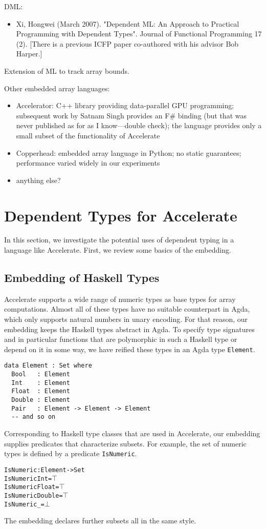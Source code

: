 \documentclass{llncs}
\begin{document}
DML:
\begin{itemize}
\item Xi, Hongwei (March 2007). "Dependent ML: An Approach to Practical Programming with Dependent Types". Journal of Functional Programming 17 (2). [There is a previous ICFP paper co-authored with his advisor Bob Harper.]
\end{itemize}
Extension of ML to track array bounds.

Other embedded array languages:
\begin{itemize}
\item Accelerator: C++ library providing data-parallel GPU programming; subsequent work by Satnam Singh provides an F\# binding (but that was never published as for as I know---double check); the language provides only a small subset of the functionality of Accelerate
\item Copperhead: embedded array language in Python; no static guarantees; performance varied widely in our experiments
\item anything else?
\end{itemize}


\section{Dependent Types for Accelerate}
\label{sec:dependent-types}

In this section, we investigate the potential uses of dependent typing
in a language like Accelerate. First, we review some basics of the
embedding. 

\subsection{Embedding of Haskell Types}
\label{sec:embedding-types}

Accelerate supports a wide range of numeric types as base types for
array computations. Almost all of these types have no suitable
counterpart in Agda, which only supports natural numbers in unary
encoding. For that reason, our embedding keeps the Haskell types
abstract in Agda. To specify type signatures and in particular
functions that are polymorphic in such a Haskell type or depend on it
in some way, we have reified these types in an Agda type
\texttt{Element}.
\begin{verbatim}
data Element : Set where
  Bool   : Element
  Int    : Element
  Float  : Element
  Double : Element
  Pair   : Element -> Element -> Element
  -- and so on
\end{verbatim}
Corresponding to Haskell type classes that are used in Accelerate, our
embedding supplies predicates that characterize subsets. For example,
the set of numeric types is defined by a predicate \texttt{IsNumeric}.
\begin{alltt}
IsNumeric : Element -> Set
IsNumeric Int = \(\top\)
IsNumeric Float = \(\top\)
IsNumeric Double = \(\top\)
IsNumeric _ = \(\bot\)
\end{alltt}
The embedding declares further subsets all in the same style.
\end{document}
